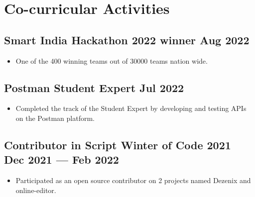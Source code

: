\documentclass[a4,10pt]{article}
\newenvironment{zitemize}{
\begin{itemize}\itemsep0pt \parskip0pt \parsep1pt}
{\end{itemize}\vspace{-0.5cm}}
\begin{document}



\section{Co-curricular Activities}
\vspace{-0.1cm}
\subsection*{Smart India Hackathon 2022 winner \hfill Aug 2022}
\vspace{-0.05cm}
\begin{zitemize}
    \item One of the 400 winning teams out of 30000 teams nation wide.
\end{zitemize} 
\vspace{-0.1cm}
\subsection*{Postman Student Expert \hfill Jul 2022}
\vspace{-0.05cm}
\begin{zitemize}
    \item Completed the track of the Student Expert by developing and testing APIs on the Postman platform.
    \end{zitemize}
\vspace{-0.1cm}
\subsection*{Contributor in Script Winter of Code 2021 \hfill Dec 2021 --- Feb 2022}
\vspace{-0.05cm}
    \begin{zitemize}
    \item Participated as an open source contributor on 2 projects named Dezenix and online-editor.
    \end{zitemize}
\vspace{-0.1cm}
\end{document}
